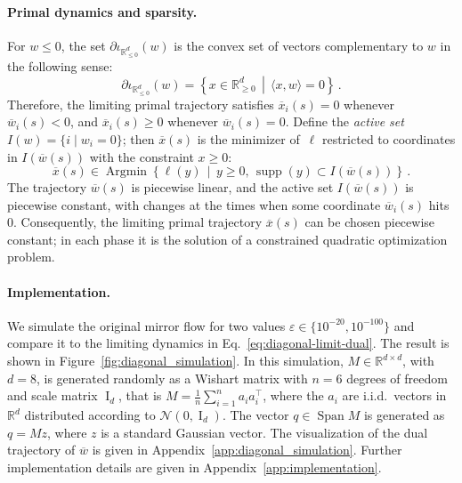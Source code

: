 \documentclass[11pt,english,reqno]{article}
\DeclareMathOperator{\Span}{Span}
\DeclareMathOperator{\I}{I}
\DeclareMathOperator{\Argmin}{Argmin}
\DeclareMathOperator{\supp}{supp}
\newcommand{\R}{\mathbb{R}}
\renewcommand{\leq}{\leqslant}
\renewcommand{\geq}{\geqslant}
\theoremstyle{plain}
\theoremstyle{definition}
\theoremstyle{remark}
\numberwithin{equation}{section}
\begin{document}
\paragraph{Primal dynamics and sparsity.} For $w \leq 0$, the set $\partial \iota_{\R_{\leq 0}^d}(w)$ is the convex set of vectors complementary to $w$ in the following sense:
%
\begin{equation*}
	\partial \iota_{\R_{\leq 0}^d}(w) = \left\{ x \in \R_{\geq 0}^d \,\middle|\, \langle x , w \rangle = 0 \right\} \, .
\end{equation*}
%
Therefore, the limiting primal trajectory satisfies $\overline{x}_i(s) = 0$ whenever $\overline{w}_i(s) < 0$, and $\overline{x}_i(s) \geq 0$ whenever $\overline{w}_i(s) = 0$. Define the \emph{active set} $I(w) = \{i \mid w_i = 0\}$; then $\overline{x}(s)$ is the minimizer of~$\ell$ restricted to coordinates in $I(\overline{w}(s))$ with the constraint $x \geq 0$:
%
\begin{equation*}
	\overline{x}(s) \in \Argmin \left\{  \ell(y) \,\middle|\, y \geq 0 , \, \supp(y) \subset I(\overline{w}(s)) \right\} \, .
\end{equation*}
%
The trajectory $\overline{w}(s)$ is piecewise linear, and the active set $I(\overline{w}(s))$ is piecewise constant, with changes at the times when some coordinate $\overline{w}_i(s)$ hits $0$. Consequently, the limiting primal trajectory $\overline{x}(s)$ can be chosen piecewise constant; in each phase it is the solution of a constrained quadratic optimization problem.

\paragraph{Implementation.} We simulate the original mirror flow for two values $\varepsilon \in \{10^{-20}, 10^{-100}\}$ and compare it to the limiting dynamics in Eq.~\eqref{eq:diagonal-limit-dual}. The result is shown in Figure~\ref{fig:diagonal_simulation}. In this simulation, $M \in \R^{d \times d}$, with $d = 8$, is generated randomly as a Wishart matrix with $n = 6$ degrees of freedom and scale matrix $\I_d$, that is $M = \frac{1}{n} \sum_{i = 1}^n a_i a_i^\top$, where the $a_i$ are i.i.d.\ vectors in $\R^d$ distributed according to $\mathcal{N}(0,\I_d)$. The vector $q \in \Span M$ is generated as $q = M z$, where $z$ is a standard Gaussian vector. The visualization of the dual trajectory of $\overline{w}$ is given in Appendix~\ref{app:diagonal_simulation}. Further implementation details are given in Appendix~\ref{app:implementation}.
\end{document}
